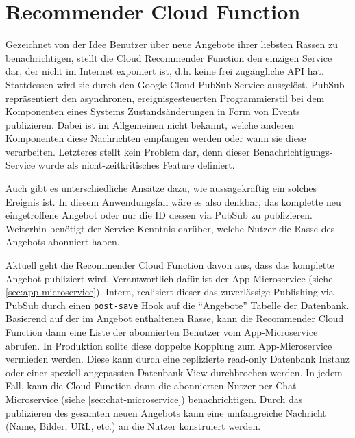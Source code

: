 \documentclass{article}
\begin{document}
\section{Recommender Cloud Function} %

Gezeichnet von der Idee Benutzer über neue Angebote ihrer liebsten Rassen zu benachrichtigen, stellt die Cloud Recommender Function den einzigen Service dar, der nicht im Internet exponiert ist, d.h. keine frei zugängliche API hat. Stattdessen wird sie durch den Google Cloud PubSub Service ausgelöst. PubSub repräsentiert den asynchronen, ereignisgesteuerten Programmierstil bei dem Komponenten eines Systems Zustandsänderungen in Form von Events publizieren. Dabei ist im Allgemeinen nicht bekannt, welche anderen Komponenten diese Nachrichten empfangen werden oder wann sie diese verarbeiten. Letzteres stellt kein Problem dar, denn dieser Benachrichtigungs-Service wurde als nicht-zeitkritisches Feature definiert.

Auch gibt es unterschiedliche Ansätze dazu, wie aussagekräftig ein solches Ereignis ist. In diesem Anwendungsfall wäre es also denkbar, das komplette neu eingetroffene Angebot oder nur die ID dessen via PubSub zu publizieren. Weiterhin benötigt der Service Kenntnis darüber, welche Nutzer die Rasse des Angebots abonniert haben.

Aktuell geht die Recommender Cloud Function davon aus, dass das komplette Angebot publiziert wird. Verantwortlich dafür ist der App-Microservice (siehe \autoref{sec:app-microservice}). Intern, realisiert dieser das zuverlässige Publishing via PubSub durch einen \texttt{post-save} Hook auf die \enquote{Angebote} Tabelle der Datenbank. Basierend auf der im Angebot enthaltenen Rasse, kann die Recommender Cloud Function dann eine Liste der abonnierten Benutzer vom App-Microservice abrufen. In Produktion sollte diese doppelte Kopplung zum App-Microservice vermieden werden. Diese kann durch eine replizierte read-only Datenbank Instanz oder einer speziell angepassten Datenbank-View durchbrochen werden. In jedem Fall, kann die Cloud Function dann die abonnierten Nutzer per Chat-Microservice (siehe \autoref{sec:chat-microservice}) benachrichtigen. Durch das publizieren des gesamten neuen Angebots kann eine umfangreiche Nachricht (Name, Bilder, URL, etc.) an die Nutzer konstruiert werden.
\end{document}
